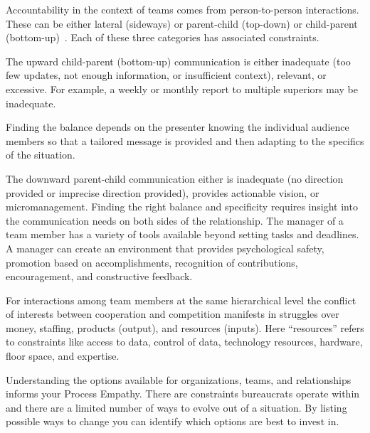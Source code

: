 Accountability in the context of teams comes from person-to-person interactions. These can be either lateral (sideways) or parent-child (top-down) or child-parent (bottom-up)~\cite{2014_Jorgensen}. Each of these three categories has associated constraints.

The upward child-parent (bottom-up) communication is either inadequate (too few updates, not enough information, or insufficient context), relevant, or excessive. For example, a weekly or monthly report to multiple superiors may be inadequate. 

Finding the balance depends on the presenter knowing the individual audience members so that a tailored message is provided and then adapting to the specifics of the situation. 

The downward parent-child communication either is inadequate (no direction provided or imprecise direction provided), provides actionable vision, or micromanagement. Finding the right balance and specificity requires insight into the communication needs on both sides of the relationship. The manager of a team member has a variety of tools available beyond setting tasks and deadlines. A manager can create an environment that provides psychological safety, promotion based on accomplishments, recognition of contributions, encouragement, and constructive feedback.

For interactions among team members at the same hierarchical level the conflict of interests between cooperation and competition manifests in struggles over money, staffing, products (output), and resources (inputs). Here ``resources''  refers to constraints like access to data, control of data, technology resources, hardware, floor space, and expertise. 


Understanding the options available for organizations, teams, and relationships informs your Process Empathy. There are constraints bureaucrats operate within and there are a limited number of ways to evolve out of a situation. By listing possible ways to change you can identify which options are best to invest in. 
